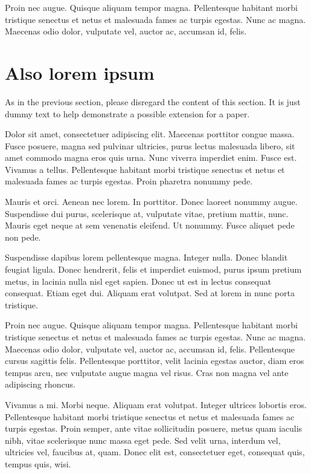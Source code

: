 \documentclass[extendedabs]{recpad2k}
\begin{document}
Proin nec augue. Quisque aliquam tempor magna. Pellentesque habitant morbi tristique senectus et netus et malesuada fames ac turpis egestas. Nunc ac magna. Maecenas odio dolor, vulputate vel, auctor ac, accumsan id, felis.

\section{Also lorem ipsum}

As in the previous section, please disregard the content of this section. It is just dummy text to help demonstrate a possible extension for a paper.

Dolor sit amet, consectetuer adipiscing elit. Maecenas porttitor congue massa. Fusce posuere, magna sed pulvinar ultricies, purus lectus malesuada libero, sit amet commodo magna eros quis urna. Nunc viverra imperdiet enim. Fusce est. Vivamus a tellus. Pellentesque habitant morbi tristique senectus et netus et malesuada fames ac turpis egestas. Proin pharetra nonummy pede.

Mauris et orci. Aenean nec lorem. In porttitor. Donec laoreet nonummy augue. Suspendisse dui purus, scelerisque at, vulputate vitae, pretium mattis, nunc. Mauris eget neque at sem venenatis eleifend. Ut nonummy. Fusce aliquet pede non pede.

Suspendisse dapibus lorem pellentesque magna. Integer nulla. Donec blandit feugiat ligula. Donec hendrerit, felis et imperdiet euismod, purus ipsum pretium metus, in lacinia nulla nisl eget sapien. Donec ut est in lectus consequat consequat. Etiam eget dui. Aliquam erat volutpat. Sed at lorem in nunc porta tristique.

Proin nec augue. Quisque aliquam tempor magna. Pellentesque habitant morbi tristique senectus et netus et malesuada fames ac turpis egestas. Nunc ac magna. Maecenas odio dolor, vulputate vel, auctor ac, accumsan id, felis. Pellentesque cursus sagittis felis. Pellentesque porttitor, velit lacinia egestas auctor, diam eros tempus arcu, nec vulputate augue magna vel risus. Cras non magna vel ante adipiscing rhoncus.

Vivamus a mi. Morbi neque. Aliquam erat volutpat. Integer ultrices lobortis eros. Pellentesque habitant morbi tristique senectus et netus et malesuada fames ac turpis egestas. Proin semper, ante vitae sollicitudin posuere, metus quam iaculis nibh, vitae scelerisque nunc massa eget pede. Sed velit urna, interdum vel, ultricies vel, faucibus at, quam. Donec elit est, consectetuer eget, consequat quis, tempus quis, wisi.



\end{document}

